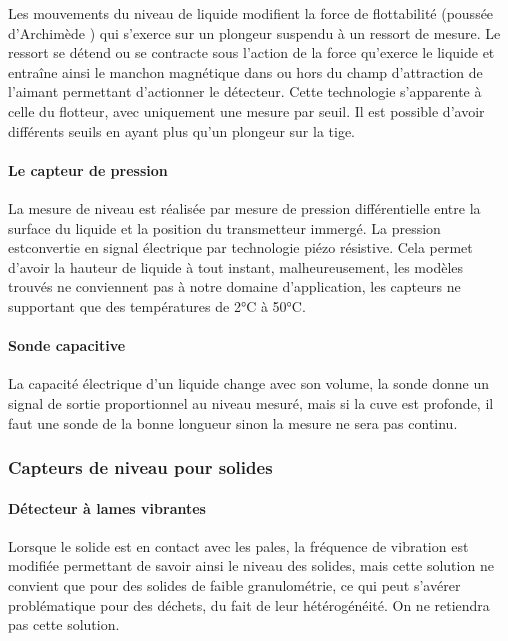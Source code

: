 Les mouvements du niveau de liquide modifient la force de flottabilité (poussée d'Archimède ) qui s'exerce sur un plongeur suspendu à un ressort de mesure. Le ressort se détend ou se contracte sous l'action de la force qu'exerce le liquide et entraîne ainsi le manchon magnétique dans ou hors du champ d'attraction de l'aimant permettant d'actionner le détecteur. Cette technologie s'apparente à celle du flotteur, avec uniquement une mesure par seuil. Il est possible d'avoir différents seuils en ayant plus qu'un plongeur sur la tige.

\paragraph{Le capteur de pression}

La mesure de niveau est réalisée par mesure de pression différentielle entre la surface du liquide et la position du transmetteur immergé. La pression estconvertie en signal électrique par technologie piézo résistive. Cela permet d'avoir la hauteur de liquide à tout instant, malheureusement, les modèles trouvés ne conviennent pas à notre domaine d'application, les capteurs ne supportant que des températures de 2°C à 50°C.

\paragraph{Sonde capacitive}
La capacité électrique d'un liquide change avec son volume, la sonde donne un signal de sortie proportionnel au niveau mesuré, mais si la cuve est profonde, il faut une sonde de la bonne longueur sinon la mesure ne sera pas continu.

\subsubsection{Capteurs de niveau pour solides} 

\paragraph{Détecteur à lames vibrantes}

Lorsque le solide est en contact avec les pales, la fréquence de vibration est modifiée permettant de savoir ainsi le niveau des solides, mais cette solution ne convient que pour des solides de faible granulométrie, ce qui peut s’avérer problématique pour des déchets, du fait de leur hétérogénéité. On ne retiendra pas cette solution.

